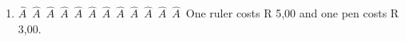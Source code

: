 {\begin{mdframed}[linewidth=4, leftmargin=40, rightmargin=40]
\begin{exercise}
\begin{enumerate}[noitemsep, label=\textbf{Step} \textbf{\arabic*}. ]
{\begin{equation}
      \end{equation}
    }{%
    \setlength{\mymathboxwidth}{\columnwidth}
      \addtolength{\mymathboxwidth}{-48pt}
    \par\vspace{12pt}\noindent\begin{minipage}{\columnwidth}
    \parbox[t]{\mymathboxwidth}{\large$
    y=8-5y=3$}\hfill
    \parbox[t]{48pt}{\raggedleft 
    (9.91)}
    \end{minipage}\vspace{12pt}\par
    }%
        \item  
        \label{m39262*id162689}\ensuremath{\hat{A}}~\ensuremath{\hat{A}}~\ensuremath{\hat{A}}~\ensuremath{\hat{A}}~\ensuremath{\hat{A}}~\ensuremath{\hat{A}}~\ensuremath{\hat{A}}~\ensuremath{\hat{A}}~\ensuremath{\hat{A}}~\ensuremath{\hat{A}}~\ensuremath{\hat{A}}~\ensuremath{\hat{A}}~One ruler costs R 5,00 and one pen costs R 3,00.
 \par 
        \end{enumerate}
    \end{exercise}
    \end{mdframed}
    }
 \label{m39257*secfhsst!!!underscore!!!id5599}\vspace{.5cm} 
      \noindent
